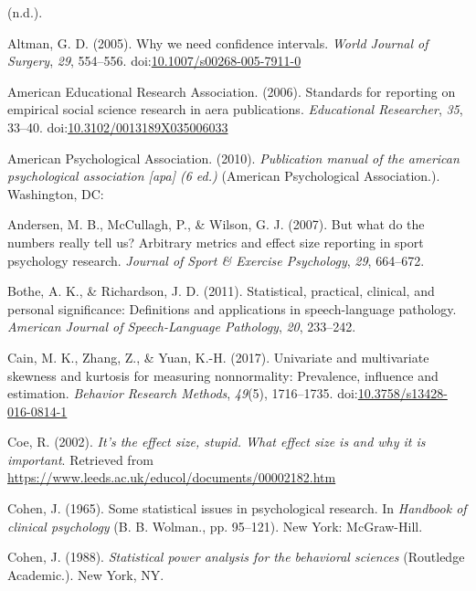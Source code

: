 \documentclass[
  man,floatsintext]{apa6}
\begin{document}
\leavevmode\hypertarget{ref-Keselman_et_al_2008}{}%
(n.d.).

\leavevmode\hypertarget{ref-Altman_2005}{}%
Altman, G. D. (2005). Why we need confidence intervals. \emph{World Journal of Surgery}, \emph{29}, 554--556. doi:\href{https://doi.org/10.1007/s00268-005-7911-0}{10.1007/s00268-005-7911-0}

\leavevmode\hypertarget{ref-AERA_2006}{}%
American Educational Research Association. (2006). Standards for reporting on empirical social science research in aera publications. \emph{Educational Researcher}, \emph{35}, 33--40. doi:\href{https://doi.org/10.3102/0013189X035006033}{10.3102/0013189X035006033}

\leavevmode\hypertarget{ref-APA_2010}{}%
American Psychological Association. (2010). \emph{Publication manual of the american psychological association {[}apa{]} (6 ed.)} (American Psychological Association.). Washington, DC:

\leavevmode\hypertarget{ref-Andersen_et_al_2007}{}%
Andersen, M. B., McCullagh, P., \& Wilson, G. J. (2007). But what do the numbers really tell us? Arbitrary metrics and effect size reporting in sport psychology research. \emph{Journal of Sport \& Exercise Psychology}, \emph{29}, 664--672.

\leavevmode\hypertarget{ref-Bothe_Richardson_2011}{}%
Bothe, A. K., \& Richardson, J. D. (2011). Statistical, practical, clinical, and personal significance: Definitions and applications in speech-language pathology. \emph{American Journal of Speech-Language Pathology}, \emph{20}, 233--242.

\leavevmode\hypertarget{ref-Cain_et_al_2017}{}%
Cain, M. K., Zhang, Z., \& Yuan, K.-H. (2017). Univariate and multivariate skewness and kurtosis for measuring nonnormality: Prevalence, influence and estimation. \emph{Behavior Research Methods}, \emph{49}(5), 1716--1735. doi:\href{https://doi.org/10.3758/s13428-016-0814-1}{10.3758/s13428-016-0814-1}

\leavevmode\hypertarget{ref-Coe_2002}{}%
Coe, R. (2002). \emph{It's the effect size, stupid. What effect size is and why it is important}. Retrieved from \url{https://www.leeds.ac.uk/educol/documents/00002182.htm}

\leavevmode\hypertarget{ref-Cohen_1965}{}%
Cohen, J. (1965). Some statistical issues in psychological research. In \emph{Handbook of clinical psychology} (B. B. Wolman., pp. 95--121). New York: McGraw-Hill.

\leavevmode\hypertarget{ref-Cohen_1988}{}%
Cohen, J. (1988). \emph{Statistical power analysis for the behavioral sciences} (Routledge Academic.). New York, NY.
\end{document}
